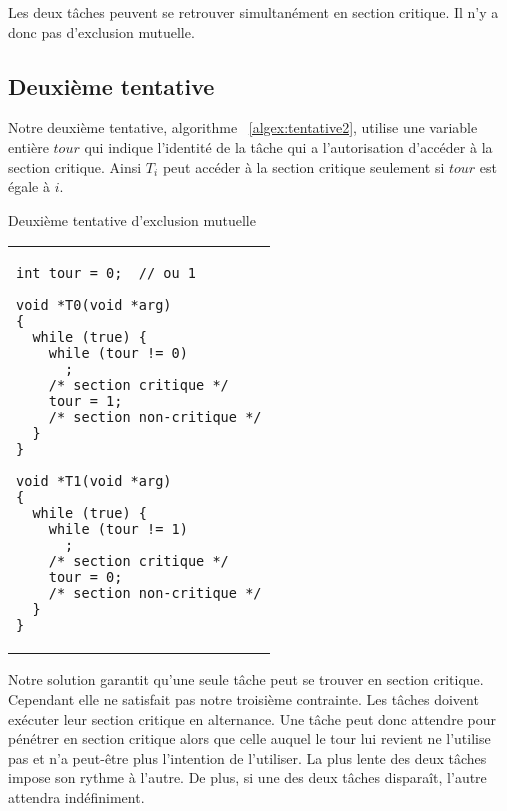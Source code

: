 Les deux tâches peuvent se retrouver simultanément en section critique.  Il n'y a donc pas d'exclusion mutuelle.

\subsection*{Deuxième tentative}
Notre deuxième tentative, algorithme ~\ref{algex:tentative2}, utilise une variable entière $tour$ qui indique l'identité de la tâche qui a l'autorisation d'accéder à la section critique.
Ainsi $T_i$ peut accéder à la section critique seulement si $tour$ est égale à $i$.

\begin{algorithm}[!ht]
  \caption{Deuxième tentative d'exclusion mutuelle}\label{algex:tentative2}
  \centering
  \begin{tabular}{l}
    \lstset{language=C++}
    \begin{lstlisting}
int tour = 0;  // ou 1

void *T0(void *arg)
{
  while (true) {
    while (tour != 0)
      ;
    /* section critique */
    tour = 1;
    /* section non-critique */
  }
}

void *T1(void *arg)
{
  while (true) {
    while (tour != 1)
      ;
    /* section critique */
    tour = 0;
    /* section non-critique */
  }
}
\end{lstlisting}
  \end{tabular}

\end{algorithm}

Notre solution garantit qu'une seule tâche peut se trouver en section critique.  Cependant elle ne satisfait pas notre troisième contrainte.
Les tâches doivent exécuter leur section critique en alternance.
Une tâche peut donc attendre pour pénétrer en section critique alors que celle auquel le tour lui revient ne l'utilise pas et n'a peut-être plus l'intention de l'utiliser.
La plus lente des deux tâches impose son rythme à l'autre.  De plus, si une des deux tâches disparaît, l'autre attendra indéfiniment.

